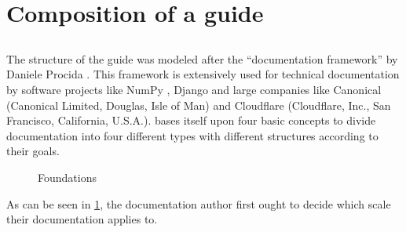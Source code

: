 \section{Composition of a guide}
\label{s:guide-creation}

\subsection{\diatx}
\label{s:diataxis}
The structure of the guide was modeled after the ``\diatx\space documentation framework'' by Daniele Procida \cite{procidaDiataxisDocumentationFramework2023,aghajaniSoftwareDocumentationPractitioners2020}.
This framework is extensively used for technical documentation by software projects like NumPy \cite{harrisArrayProgrammingNumPy2020}, Django \cite{Django2013} and large companies like Canonical (Canonical Limited, Douglas, Isle of Man) and Cloudflare (Cloudflare, Inc., San Francisco, California, U.S.A.).
\diatx\space bases itself upon four basic concepts to divide documentation into four different types with different structures according to their goals.\\
\begin{figure}
	\begin{center}
	\end{center}
	\label{fig:diataxis-foundation}
	\caption{\diatx\space Foundations \cite{procidaDiataxisDocumentationFramework2023}}
\end{figure}
\noindent
As can be seen in \cref{fig:diataxis-foundation}, the documentation author first ought to decide which scale their documentation applies to.
